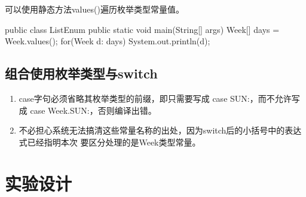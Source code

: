 可以使用静态方法values()遍历枚举类型常量值。


\begin{javaCode}
  public class ListEnum {
    public static void main(String[] args) {
      Week[] days = Week.values();
      for(Week d: days) {
        System.out.println(d);
      }
    }
  }
\end{javaCode}

\subsection{组合使用枚举类型与switch}



\begin{enumerate}
\item case字句必须省略其枚举类型的前缀，即只需要写成 case SUN:，而不允许写成 case
  Week.SUN:，否则编译出错。
\item 不必担心系统无法搞清这些常量名称的出处，因为switch后的小括号中的表达式已经指明本次
  要区分处理的是Week类型常量。
\end{enumerate}



\newpage
\section*{实验设计}
\sline